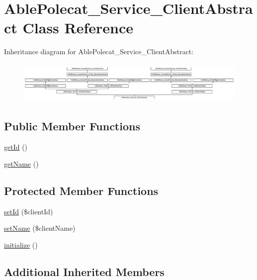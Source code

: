 \hypertarget{class_able_polecat___service___client_abstract}{}\section{Able\+Polecat\+\_\+\+Service\+\_\+\+Client\+Abstract Class Reference}
\label{class_able_polecat___service___client_abstract}
Inheritance diagram for Able\+Polecat\+\_\+\+Service\+\_\+\+Client\+Abstract\+:\begin{figure}[H]
\begin{center}
\leavevmode
\includegraphics[height=2.048780cm]{class_able_polecat___service___client_abstract}
\end{center}
\end{figure}
\subsection*{Public Member Functions}
\begin{DoxyCompactItemize}
\item 
\hyperlink{class_able_polecat___service___client_abstract_a12251d0c022e9e21c137a105ff683f13}{get\+Id} ()
\item 
\hyperlink{class_able_polecat___service___client_abstract_a3d0963e68bb313b163a73f2803c64600}{get\+Name} ()
\end{DoxyCompactItemize}
\subsection*{Protected Member Functions}
\begin{DoxyCompactItemize}
\item 
\hyperlink{class_able_polecat___service___client_abstract_a89488c902e46a733882cc81d473bbfcb}{set\+Id} (\$client\+Id)
\item 
\hyperlink{class_able_polecat___service___client_abstract_abd06afd27b593ff9afefc8c5ac81a4c9}{set\+Name} (\$client\+Name)
\item 
\hyperlink{class_able_polecat___service___client_abstract_a91098fa7d1917ce4833f284bbef12627}{initialize} ()
\end{DoxyCompactItemize}
\subsection*{Additional Inherited Members}


